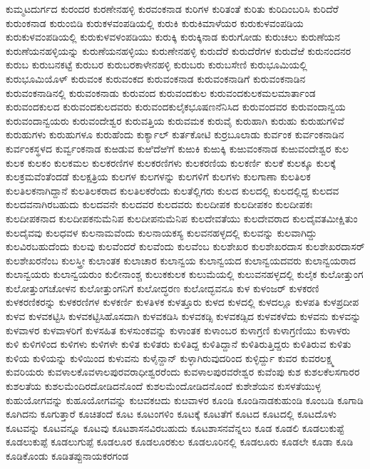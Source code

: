 {ಕುಮ್ಮಟದುರ್ಗದ
ಕುರಂದರ
ಕುರಣೇನಹಳ್ಳಿ
ಕುರವಂಕನಾಡ
ಕುರಿಗಳ
ಕುರಿತಂತೆ
ಕುರಿತು
ಕುರಿದಿಂಬರಿಸಿ
ಕುರಿದೆರೆ
ಕುರುಂಕನಾಡ
ಕುರುಂಬಿಡಿ
ಕುರುಕಳವಂಪಡಿಯಲ್ಲಿ
ಕುರುಕಿ
ಕುರುಕಿಮಾಳೆಯರ
ಕುರುಕುಳವಂಪಡಿಯ
ಕುರುಕುಳವಂಪಡಿಯಲ್ಲಿ
ಕುರುಕುಳವಳಂಪಡಿಯು
ಕುರುಕ್ಕಿ
ಕುರುಕ್ಕಿನಾಡ
ಕುರುಗೋಡು
ಕುರುಚಲು
ಕುರುಣೆಯನ
ಕುರುಣೆಯನಹಳ್ಳಿಯನ್ನು
ಕುರುಣೆಯನಹಳ್ಳಿಯು
ಕುರುಣೇನಹಳ್ಳಿ
ಕುರುದೆರೆ
ಕುರುದೆರೆಗಳ
ಕುರುದೆಱೆ
ಕುರುನಂದನರ
ಕುರುಬ
ಕುರುಬನಕಟ್ಟೆ
ಕುರುಬರ
ಕುರುಬರಕಾಳೇನಹಳ್ಳಿ
ಕುರುಬರು
ಕುರುಬಸೇಣಿ
ಕುರುಭೂಮಿಯಲ್ಲಿ
ಕುರುಭೂಮಿಯೊಳ್
ಕುರುವಂಕ
ಕುರುವಂಕದ
ಕುರುವಂಕನಾಡ
ಕುರುವಂಕನಾಡಿಗೆ
ಕುರುವಂಕನಾಡಿನ
ಕುರುವಂಕನಾಡಿನಲ್ಲಿ
ಕುರುವಂಕನಾಡು
ಕುರುವಂದ
ಕುರುವಂದಕುಲ
ಕುರುವಂದಕುಲಕಮಲಮಾರ್ತಾಂಡ
ಕುರುವಂದಕುಲದ
ಕುರುವಂದಕುಲದವರು
ಕುರುವಂದಕುಲೈಕಭೂಷಣನೆನಿಸಿದ
ಕುರುವಂದವರ
ಕುರುವಂದಾನ್ವಯ
ಕುರುವಂದಾನ್ವಯರು
ಕುರುವಂದೇಶ್ವರ
ಕುರುವತ್ತಿಯ
ಕುರುವಮಕ
ಕುರುವೈ
ಕುರುಹಾಗಿ
ಕುರುಹು
ಕುರುಹುಗಳಿವೆ
ಕುರುಹುಗಳು
ಕುರುಹುಗಳೂ
ಕುರುಹೆಂದು
ಕುರ್ಕ್ಯಾಲ್
ಕುರ್ತಕೋಟಿ
ಕುರ್ರಬೂಲಾಡು
ಕುರ್ವಂಕ
ಕುರ್ವಂಕನಾಡಿನ
ಕುರ್ವಂಕಸ್ಥಳದ
ಕುರ್ವ್ವಂಕನಾಡ
ಕುಱಡುವ
ಕುಱಿದೆಱಿಗೆ
ಕುಱುಕಿ
ಕುಱುಕ್ಕಿ
ಕುಱುವಂಕನಾಡ
ಕುಱುವಂದೇಶ್ವರ
ಕುಲ
ಕುಲಕ
ಕುಲಕಂ
ಕುಲಕಮಲ
ಕುಲಕರಣಿಗಳ
ಕುಲಕರಣಿಗಳು
ಕುಲಕರಣಿಯ
ಕುಲಕರ್ಣಿ
ಕುಲಕೆ
ಕುಲಕ್ಕೂ
ಕುಲಕ್ಕೆ
ಕುಲಕ್ರಮವೆಂತೆಂದಡೆ
ಕುಲಕ್ಷತ್ರಿಯ
ಕುಲಗಳ
ಕುಲಗಳನ್ನು
ಕುಲಗಳಿಗೆ
ಕುಲಗಳು
ಕುಲಗಾಣಾ
ಕುಲತಿಲಕ
ಕುಲತಿಲಕನಾಗಿದ್ದಾನೆ
ಕುಲತಿಲಕರಾದ
ಕುಲತಿಲಕರೆಂದು
ಕುಲತೆಲ್ಲಿಗರು
ಕುಲದ
ಕುಲದಲ್ಲಿ
ಕುಲದಲ್ಲಿದ್ದ
ಕುಲದವ
ಕುಲದವನಾಗಿರಬಹುದು
ಕುಲದವನೇ
ಕುಲದವರ
ಕುಲದವರು
ಕುಲದೀಪಕ
ಕುಲದೀಪಕಂ
ಕುಲದೀಪಕಃ
ಕುಲದೀಪಕನಾದ
ಕುಲದೀಪಕನುಮೆನಿಪ
ಕುಲದೀಪನುಮೆನಿಪ
ಕುಲದೇವತೆಯು
ಕುಲದೇವರಾದ
ಕುಲದೈವತಮೀಕ್ಷಿತುಂ
ಕುಲದೈವವು
ಕುಲಧವಳ
ಕುಲನಾಮವೆಂದು
ಕುಲನಾಯಕಸ್ಯ
ಕುಲವನಹಳ್ಳದಲ್ಲಿ
ಕುಲವನ್ನು
ಕುಲವಾಗಿದ್ದು
ಕುಲವಿರಬಹುದೆಂದು
ಕುಲವು
ಕುಲವೆಂದರೆ
ಕುಲವೆಂದು
ಕುಲವೆಂಬ
ಕುಲಶೇಖರ
ಕುಲಶೇಖರದಾಸ
ಕುಲಶೇಖರದಾಸರ್
ಕುಲಶೇಖರನೆಂಬ
ಕುಲಸ್ತ್ರೀ
ಕುಲಾಂತಕ
ಕುಲಾಚಾರ
ಕುಲಾನ್ವಯ
ಕುಲಾನ್ವಯದ
ಕುಲಾನ್ವಯದವರು
ಕುಲಾನ್ವಯರಾದ
ಕುಲಾನ್ವಯರು
ಕುಲಾನ್ವಯರುಂ
ಕುಲೀನಾಂಶ್ಚ
ಕುಲುಕಕುಲಕ
ಕುಲುಮೆಯಲ್ಲಿ
ಕುಲುವನಹಳ್ಳದಲ್ಲಿ
ಕುಲೈಕ
ಕುಲೋತ್ತುಂಗ
ಕುಲೋತ್ತುಂಗಚೋಳನ
ಕುಲೋತ್ತುಂಗನಿಗೆ
ಕುಲೋದ್ಧರಣ
ಕುಲೋದ್ಭವನೂ
ಕುಳ
ಕುಳಂಜರ್
ಕುಳಕರಣಿ
ಕುಳಕರಣಿಕರನ್ನು
ಕುಳಕರಣಿಗಳ
ಕುಳಕರ್ಣಿ
ಕುಳತಿಳಕ
ಕುಳತ್ತೂರು
ಕುಳದ
ಕುಳದಲ್ಲಿ
ಕುಳದಲ್ಲೂ
ಕುಳಪತಿ
ಕುಳಪ್ರದೀಪ
ಕುಳವ
ಕುಳವಕಟ್ಟಿಸಿ
ಕುಳವಕಟ್ಟಿಸಿಹೊಸದಾಗಿ
ಕುಳವಕಡಿಸಿ
ಕುಳವಕಡ್ಸಿ
ಕುಳವಕಡ್ಸಿದ
ಕುಳವಕಳೆದು
ಕುಳವನು
ಕುಳವನ್ನು
ಕುಳವಾಳರ
ಕುಳವಾಳರಿಗೆ
ಕುಳಸಹಿತ
ಕುಳಸುಂಕವನ್ನು
ಕುಳಾಂತಕ
ಕುಳಾಂಬರ
ಕುಳಾಗ್ರಣಿ
ಕುಳಾಗ್ರಣಿಯು
ಕುಳಾಳರು
ಕುಳಿ
ಕುಳಿಗಳಿಂದ
ಕುಳಿಗಳು
ಕುಳಿಗಳೇ
ಕುಳಿತ
ಕುಳಿತರು
ಕುಳಿತಿದ್ದ
ಕುಳಿತಿದ್ದಾನೆ
ಕುಳಿತಿರುತ್ತಿದ್ದರು
ಕುಳಿತಿರುವ
ಕುಳಿತು
ಕುಳಿಯ
ಕುಳಿಯನ್ನು
ಕುಳಿಯಿಂದ
ಕುಳುವನು
ಕುಳೈನ್ದಾನ್
ಕುಳ್ಳಾಗಿರುವುದರಿಂದ
ಕುಳ್ಳಿರ್ದ್ದು
ಕುವರ
ಕುವರಲಕ್ಷ್ಮ
ಕುವರಿಯರು
ಕುವಳಾಲಕೊವಳಾಲಪುರವರಾಧೀಶ್ವರರೆಂದು
ಕುವಳಾಲಪುರವರೇಶ್ವರ
ಕುವೆಂಪು
ಕುಶ
ಕುಶಲಕೆಲಸಗಾರರ
ಕುಶಲತೆಯ
ಕುಶಲಮೆಂದಿರದೋಡಿದನೊಂದೆ
ಕುಶಲಮೆಂದೋಡಿದನೊಂದೆ
ಕುಶೇಶೆಯನ
ಕುಸಳತೆಯುಳ್ಳ
ಕುಹುಯೋಗವನ್ನು
ಕುಹೂಯೋಗವನ್ನು
ಕುೞವಕೞದು
ಕುೞವಾಳರ
ಕೂಂಡಿ
ಕೂಂಡಿನಾಡಕುಹುಂಡಿ
ಕೂಂಬಡಿ
ಕೂಗಾಡಿ
ಕೂಗಿದನು
ಕೂಗುತ್ತಾರೆ
ಕೂಚಿತಂದೆ
ಕೂಟ
ಕೂಟಂಗಳಿಂ
ಕೂಟಕ್ಕೆ
ಕೂಟತೆಗೆ
ಕೂಟದ
ಕೂಟದಲ್ಲಿ
ಕೂಟದೊಳು
ಕೂಟವನ್ನು
ಕೂಟವನ್ನೂ
ಕೂಟವು
ಕೂಟಶಾಸನವಿರಬಹುದು
ಕೂಟಶಾಸನವೆನ್ನಲು
ಕೂಡ
ಕೂಡಲಿ
ಕೂಡಲುಕುಪ್ಟೆ
ಕೂಡಲುಕುಪ್ಪೆ
ಕೂಡಲುಗುಪ್ಪೆ
ಕೂಡಲೂರ
ಕೂಡಲೂರಕುಲ
ಕೂಡಲೂರಿನಲ್ಲಿ
ಕೂಡಲೂರು
ಕೂಡಲೇ
ಕೂಡಾ
ಕೂಡಿ
ಕೂಡಿಕೊಂಡು
ಕೂಡಿತಪ್ಪುನಾಯಕರಗಂಡ
}
